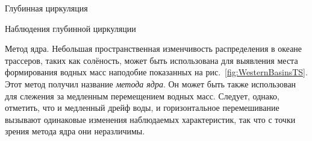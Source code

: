 \begin{chapter}{Глубинная циркуляция}
\begin{section}{Наблюдения глубинной циркуляции}
\begin{paragraph}{Метод ядра.}
Небольшая пространственная изменчивость распределения в океане трассеров,
таких как солёность, может быть использована для выявления места формирования
водных масс наподобие показанных на рис.~\ref{fig:WesternBasinsTS}.
Этот метод получил название \emph{метода ядра}. 
Он может быть также использован для слежения за медленным перемещением водных
масс. Следует, однако, отметить, что и медленный дрейф воды, и горизонтальное
перемешивание вызывают одинаковые 
изменения наблюдаемых характеристик, так что с точки зрения метода ядра 
они неразличимы.
%


\end{paragraph}
\end{section}
\end{chapter}
